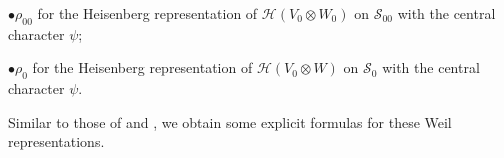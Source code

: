 \documentclass[article]{article}
\numberwithin{equation}{section}
\theoremstyle{definition}
\begin{document}
$\bullet \rho_{00}$ for the Heisenberg representation of $\mathcal{H}(V_0 \otimes W_0)$ on $\mathscr{S}_{00}$ with the central character $\psi$;

$\bullet \rho_0$ for the Heisenberg representation of $\mathcal{H}\left(V_0 \otimes W\right)$ on $\mathscr{S}_0$ with the central character $\psi$.
\begin{comment}
$\bullet \rho$ for the Heisenberg representation of $\mathcal{H}\left(V \otimes W\right)$ on $\mathcal{S}$ with the central character $\psi$ .
\end{comment}

Similar to those of \cite[Lemma 6.2,6.3,6.4]{MR3788848} and \cite[\S 7.4]{MR3573972}, we obtain some explicit formulas for these Weil representations. 
\begin{comment}
For $\varphi_{00} \in \mathcal{S}_{00}$ and $x \in V_0 \otimes Y_{n_0}^{*}$
$$\begin{array}{rlr}{[\omega_{00}(h_0) \varphi_{00}](x)} & {=\varphi_{00}\left(h_{0}^{-1} x\right),} & {h_0 \in \mathrm{O}(V_0)} \\
{\left[\omega_{00}\left(m(a)\right) \varphi_{00}\right](x)} & {=\chi_{V}\left(\operatorname{det}(a)\right)\left|\operatorname{det}(a)\right|_{F}^{n_0} \varphi_{00}\left(a^{*} x\right),} & {a \in \operatorname{GL}\left(Y_{n_0}\right)} \\ {\left[\omega_{00}\left(u(c)\right) \varphi_{00}\right](x)} & {=\psi\left(\frac{1}{2}\left\langle c x, x\right\rangle\right) \varphi_{00}(x),} & {c \in \operatorname{Sym}\left(Y_{n_0}^{*}, Y_{n_0}\right)} \\ 
{[\omega_{00}(w) \varphi_{00}](x)} & {=\gamma_{V}^{-n} \int_{V_0 \otimes Y_{n_0}} \varphi_{00}\left(I^{-1} z\right) \psi(-\langle z, x\rangle) d z}\end{array}$$
Here 
$$
w=\left (\begin{array}{cc}
0& -I_{Y_{n_0}}\\
I_{Y_{n_0}}^{-1}& 0
\end{array}\right)
$$
and  $\gamma_{V}$ is a 4 th root of unity satisfying $\gamma_{V}^{2}=\chi_{V}(-1)$. 
\end{comment}
\end{document}
